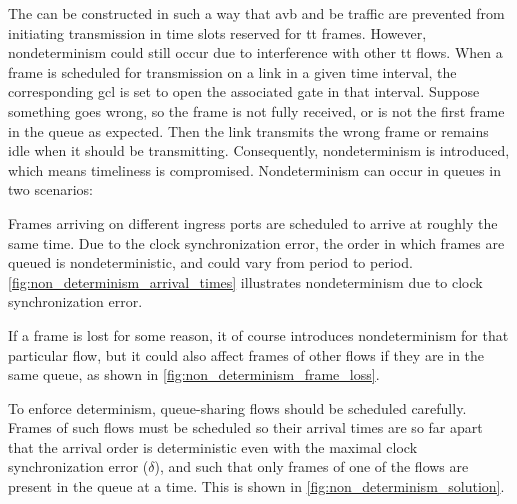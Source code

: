The  can be constructed in such a way that \gls{avb} and \gls{be} traffic are prevented from initiating transmission in time slots reserved for \gls{tt} frames.
However, nondeterminism could still occur due to interference with other \gls{tt} flows. When a frame is scheduled for transmission on a link in a given time interval, the corresponding \gls{gcl} is set to open the associated gate in that interval.
Suppose something goes wrong, so the frame is not fully received, or is not the first frame in the queue as expected. Then the link transmits the wrong frame or remains idle when it should be transmitting.
Consequently, nondeterminism is introduced, which means timeliness is compromised.
Nondeterminism can occur in queues in two scenarios:
\begin{enumerate*}[(i)]
   \item Frames arriving on different ingress ports are scheduled to arrive at roughly the same time.
   Due to the clock synchronization error, the order in which frames are queued is nondeterministic, and could vary from period to period.  \autoref{fig:non_determinism_arrival_times} illustrates nondeterminism due to clock synchronization error.
   
   \item If a frame is lost for some reason, it of course introduces nondeterminism for that particular flow, but it could also affect frames of other flows if they are in the same queue, as shown in \autoref{fig:non_determinism_frame_loss}.
\end{enumerate*}
To enforce determinism, queue-sharing flows should be scheduled carefully.
Frames of such flows must be scheduled so their arrival times are so far apart that the arrival order is deterministic even with the maximal clock synchronization error ($\delta$), and such that only frames of one of the flows are present in the queue at a time.
This is shown in \autoref{fig:non_determinism_solution}.

